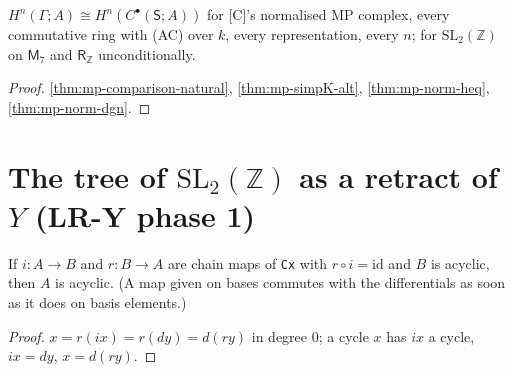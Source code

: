 \begin{theorem}\label{thm:mp-comparison-normalised}
  \leanok
  $H^n(\Gamma;A)\cong H^n(C^\bullet(\mathsf S;A))$ for [C]'s normalised MP complex, every commutative ring with (AC) over $k$, every
  representation, every $n$; for $\mathrm{SL}_2(\mathbb Z)$ on $\mathsf M_7$ and $\mathsf R_{\mathbb Z}$ unconditionally.
\end{theorem}
\begin{proof}
  \leanok
  \ref{thm:mp-comparison-natural}, \ref{thm:mp-simpK-alt}, \ref{thm:mp-norm-heq}, \ref{thm:mp-norm-dgn}.
\end{proof}

\section{The tree of $\mathrm{SL}_2(\mathbb Z)$ as a retract of $Y$ (LR-Y phase 1)}

\begin{lemma}\label{lem:mp-cx-retract}
  \leanok
  If $i\colon A\to B$ and $r\colon B\to A$ are chain maps of \texttt{Cx} with $r\circ i=\mathrm{id}$ and $B$ is acyclic, then $A$ is
  acyclic.  (A map given on bases commutes with the differentials as soon as it does on basis elements.)
\end{lemma}
\begin{proof}
  \leanok
  $x=r(ix)=r(dy)=d(ry)$ in degree $0$; a cycle $x$ has $ix$ a cycle, $ix=dy$, $x=d(ry)$.
\end{proof}

